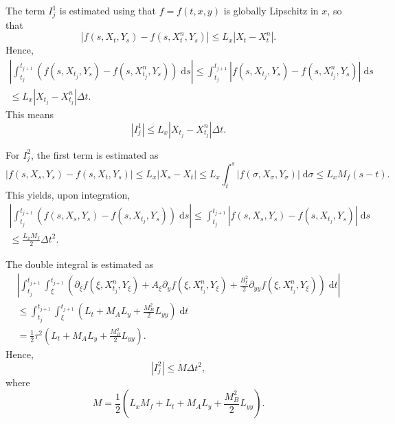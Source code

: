 \documentclass[reqno,12pt]{amsart}
\theoremstyle{plain}%
\theoremstyle{definition}
\begin{document}
The term $I_j^1$ is estimated using that $f=f(t, x, y)$ is globally Lipschitz in $x$, so that
$$
\left| f(s, X_t, Y_s) - f(s, X_t^n, Y_s) \right| \leq L_x |X_t - X_t^n|.
$$
Hence,
\begin{multline*}
\left|  \int_{t_j}^{t_{j+1}} \left( f(s, X_{t_j}, Y_s) - f(s, X_{t_j}^n, Y_s)  \right) \;\mathrm{d}s \right| \leq   \int_{t_j}^{t_{j+1}} \left| f(s, X_{t_j}, Y_s) - f(s, X_{t_j}^n, Y_s)  \right| \;\mathrm{d} s \\ \leq L_x |X_{t_j} - X_{t_j}^n| \Delta t.
\end{multline*}
This means
\begin{equation}
\label{I1estimate}
\left| I_j^1 \right| \leq L_x |X_{t_j} - X_{t_j}^n| \Delta t.
\end{equation}

For $I_j^2$, the first term is estimated as
$$
\left| f(s, X_s, Y_s) - f(s, X_t, Y_s) \right| \leq L_x |X_s - X_t| \leq L_x \int_t^s |f(\sigma, X_\sigma, Y_\sigma)| \;\mathrm{d}\sigma \leq L_x M_f (s - t).
$$
This yields, upon integration,
\begin{multline*}
\left|  \int_{t_j}^{t_{j+1}} \left(f(s, X_s, Y_s) - f(s, X_{t_j}, Y_s) \right) \;\mathrm{d}s \right| \leq  \int_{t_j}^{t_{j+1}} \left| f(s, X_s, Y_s) - f(s, X_{t_j}, Y_s) \right| \;\mathrm{d} s \\
\leq \frac{L_x M_f}{2} \Delta t^2.
\end{multline*}

The double integral is estimated as
\begin{multline}
   \left|  \int_{t_j}^{t_{j+1}}  \int_\xi^{t_{j+1}} \left(\partial_\xi f(\xi, X_{t_j}^n, Y_\xi) + A_\xi \partial_y f(\xi, X_{t_j}^n, Y_\xi)  + \frac{B_\xi^2}{2}\partial_{yy}f(\xi, X_{t_j}^n, Y_\xi) \right) \;\mathrm{d}t \right| \\
   \leq \int_{t_j}^{t_{j+1}}  \int_\xi^{t_{j+1}} \left(L_t + M_A L_y  + \frac{M_B^2}{2}L_{yy} \right) \;\mathrm{d}t \\
   = \frac{1}{2}\tau^2\left(L_t + M_A L_y  + \frac{M_B^2}{2}L_{yy} \right).
\end{multline}
Hence,
\begin{equation}
\label{I2estimate}
\left| I_j^2 \right| \leq M\Delta t^2,
\end{equation}
where
$$
M = \frac{1}{2}\left(L_x M_f + L_t + M_A L_y  + \frac{M_B^2}{2}L_{yy} \right).
$$
\end{document}
